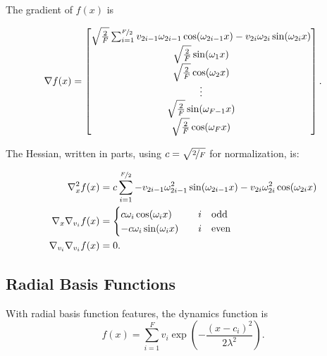 The gradient of $f(x)$ is
\begin{fullwidth}\vspace{-\baselineskip}
\begin{equation}
  \nabla f(x) =
  \begin{bmatrix}
    \sqrt{\frac{2}{F}}\sum_{i=1}^{\nicefrac{F}{2}}
      v_{2i-1} \omega_{2i-1} \cos(\omega_{2i-1} x)
      - v_{2i} \omega_{2i} \sin(\omega_{2i} x) \\
    \sqrt{\frac{2}{F}} \sin(\omega_{1} x)\\
    \sqrt{\frac{2}{F}} \cos(\omega_{2} x)\\
    \vdots \\
    \sqrt{\frac{2}{F}} \sin(\omega_{F-1} x)\\
    \sqrt{\frac{2}{F}} \cos(\omega_{F} x)
  \end{bmatrix}.
\end{equation}
\end{fullwidth}

The Hessian, written in parts,
using $c = \sqrt{\nicefrac{2}{F}}$ for normalization, is:
\begin{fullwidth}\vspace{-\baselineskip}
\begin{subequations}
  \begin{align}
    \nabla^2_x f(x) &= c \sum_{i=1}^{\nicefrac{F}{2}}
      - v_{2i-1} \omega_{2i-1}^2 \sin(\omega_{2i-1} x)
      - v_{2i} \omega_{2i}^2 \cos(\omega_{2i} x) \\
    \nabla_x \nabla_{v_i} f(x) &= \begin{cases}
    c \omega_i \cos(\omega_i x) & \quad i \quad \text{odd}\\
    - c \omega_i \sin(\omega_i x) & \quad i \quad \text{even}
    \end{cases}\\
    \nabla_{v_i} \nabla_{v_i} f(x) &= 0.
  \end{align}
\end{subequations}
\end{fullwidth}

\subsection{Radial Basis Functions}

With radial basis function features, the dynamics function is
\begin{equation}
  f(x) = \sum_{i=1}^F v_i \exp\left(-\frac{(x-c_i)^2}{2\lambda^2}\right).
\end{equation}

